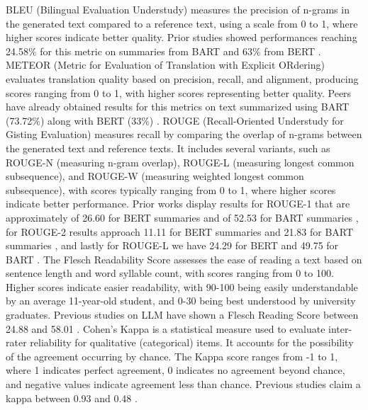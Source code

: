 \documentclass[preprint,12pt]{elsarticle}
\begin{document}
BLEU (Bilingual Evaluation Understudy) measures the precision of n-grams in the generated text compared to a reference text, using a scale from 0 to 1, where higher scores indicate better quality. Prior studies showed performances reaching 24.58\% for this metric on summaries from BART \cite{Myla2024} and 63\% from BERT \cite{Caparros-Laiz2023} . METEOR (Metric for Evaluation of Translation with Explicit ORdering) evaluates translation quality based on precision, recall, and alignment, producing scores ranging from 0 to 1, with higher scores representing better quality. Peers have already obtained  results for this metrics on text summarized using BART (73.72\%) \cite{Myla2024} along with BERT (33\%) \cite{Roy2023}. ROUGE (Recall-Oriented Understudy for Gisting Evaluation) measures recall by comparing the overlap of n-grams between the generated text and reference texts. It includes several variants, such as ROUGE-N (measuring n-gram overlap), ROUGE-L (measuring longest common subsequence), and ROUGE-W (measuring weighted longest common subsequence), with scores typically ranging from 0 to 1, where higher scores indicate better performance. Prior works display results for ROUGE-1 that are approximately of 26.60 for BERT summaries and of 52.53 for BART summaries \cite{Guo2021}, for ROUGE-2 results approach 11.11 for BERT summaries and 21.83 for BART summaries  \cite{Guo2021}, and lastly for ROUGE-L we have 24.29 for BERT and 49.75 for BART  \cite{Guo2021}.   The Flesch Readability Score assesses the ease of reading a text based on sentence length and word syllable count, with scores ranging from 0 to 100. Higher scores indicate easier readability, with 90-100 being easily understandable by an average 11-year-old student, and 0-30 being best understood by university graduates. Previous studies on LLM have shown a Flesch Reading Score between 24.88 and 58.01 \cite{Wang2023}. Cohen's Kappa is a statistical measure used to evaluate inter-rater reliability for qualitative (categorical) items. It accounts for the possibility of the agreement occurring by chance. The Kappa score ranges from -1 to 1, where 1 indicates perfect agreement, 0 indicates no agreement beyond chance, and negative values indicate agreement less than chance. Previous studies claim a kappa between 0.93 \cite{Naismith2023} and 0.48 \cite{Gomez2023}. \\
\end{document}
